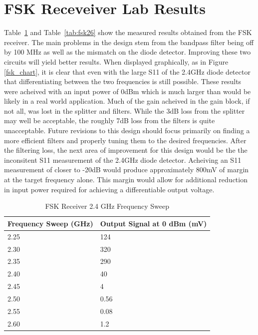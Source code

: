 \documentclass[conference]{IEEEtran}
\begin{document}
\section{FSK Receveiver Lab Results}
Table~\ref{tab:fsk24} and Table~\ref{tab:fsk26} show the measured results obtained from the FSK receiver.  The main problems in the design stem from the bandpass filter being off by 100 MHz as well as the mismatch on the diode detector.  Improving these two circuits will yield better results. When displayed graphically, as in Figure \ref{fsk_chart}, it is clear that even with the large S11 of the 2.4GHz diode detector that differentiating between the two frequencies is still possible. These results were acheived with an input power of 0dBm which is much larger than would be likely in a real world application. Much of the gain acheived in the gain block, if not all, was lost in the splitter and filters. While the 3dB loss from the splitter may well be acceptable, the roughly 7dB loss from the filters is quite unacceptable. Future revisions to this design should focus primarily on finding a more efficient filters and properly tuning them to the desired frequencies. After the filtering loss, the next area of improvement for this design would be the the inconsitent S11 measurement of the 2.4GHz diode detector. Acheiving an S11 measurement of closer to -20dB would produce approximately 800mV of margin at the target frequency alone. This margin would allow for additional reduction in input power required for achieving a differentiable output voltage.

\begin{table}
\caption{FSK Receiver 2.4 GHz Frequency Sweep}
    \begin{tabular}{|l|l|}
    \hline
    Frequency Sweep (GHz) & Output Signal at 0 dBm (mV) \\\hline
    2.25                  & 124                         \\\hline
    2.30                  & 320                         \\\hline
    2.35                  & 290                         \\\hline
    2.40                  & 40                          \\\hline
    2.45                  & 4                           \\\hline
    2.50                  & 0.56                        \\\hline
    2.55                  & 0.08                        \\\hline
    2.60                  & 1.2                         \\\hline
    \end{tabular}
\label{tab:fsk24}
\end{table}
\end{document}
